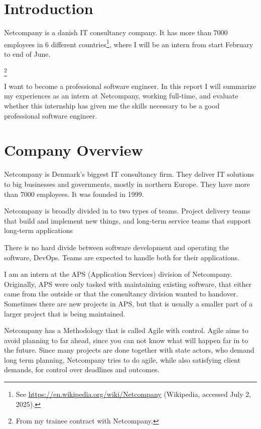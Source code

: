\documentclass[../main.tex]{subfiles}
\begin{document}
\section{Introduction}

Netcompany is a danish IT consultancy company. It has more than 7000 employees in 6 different countries\footnote{See \url{https://en.wikipedia.org/wiki/Netcompany} (Wikipedia, accessed July 2, 2025).}, where I will be an intern from start February to end of June.

\footnote{From my trainee contract with Netcompany.}

I want to become a professional software engineer. In this report I will summarize my experiences as an intern at Netcompany, working full-time, and evaluate whether this internship has given me the skills necessary to be a good professional software engineer.

\section{Company Overview}
Netcompany is Denmark's biggest IT consultancy firm. They deliver IT solutions to big businesses and governments, mostly in northern Europe. They have more than 7000 employees. It was founded in 1999. 

Netcompany is broadly divided in to two types of teams. Project delivery teams that build and implement new things, and long-term service teams that support long-term applications

There is no hard divide between software development and operating the software, DevOps. Teams are expected to handle both for their applications. 

I am an intern at the APS (Application Services) division of Netcompany. Originally, APS were only tasked with maintaining existing software, that either came from the outside or that the consultancy division wanted to handover. Sometimes there are new projects in APS, but that is usually a smaller part of a larger project that is being maintained.

Netcompany has a Methodology that is called Agile with control. Agile aims to avoid planning to far ahead, since you can not know what will happen far in to the future. Since many projects are done together with state actors, who demand long term planning, Netcompany tries to do agile, while also satisfying client demands, for control over deadlines and outcomes. 
\end{document}
